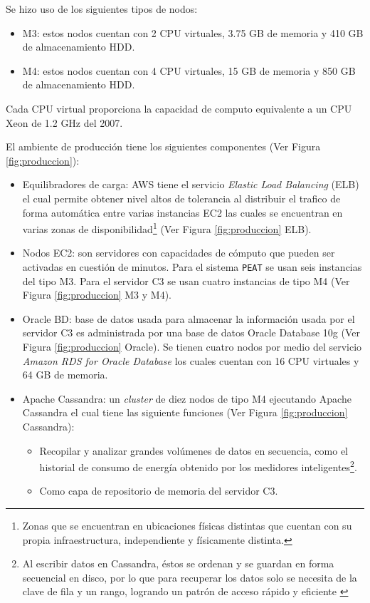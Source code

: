 
Se hizo uso de los siguientes tipos de nodos:
\begin{itemize}
\item M3: estos nodos cuentan con 2 CPU virtuales, 3.75 GB de memoria y
  410 GB de almacenamiento HDD.
\item M4: estos nodos cuentan con 4 CPU virtuales, 15 GB de memoria y
  850 GB de almacenamiento HDD.
\end{itemize}

Cada CPU virtual proporciona la capacidad de computo equivalente a un CPU
Xeon de 1.2 GHz del 2007.

\vspace{2.5mm}

El ambiente de producción tiene los siguientes componentes (Ver Figura \ref{fig:produccion}):
\begin{itemize}
\item Equilibradores de carga: AWS tiene el servicio \textit{Elastic Load Balancing}
  (ELB) el cual permite obtener nivel altos de tolerancia al distribuir el trafico
  de forma automática entre varias instancias EC2 las cuales se encuentran en
  varias zonas de disponibilidad\footnote{Zonas que se encuentran en
    ubicaciones físicas distintas que cuentan con su propia infraestructura,
    independiente y físicamente distinta.} (Ver Figura \ref{fig:produccion} ELB).
\item Nodos EC2: son servidores con capacidades de cómputo que pueden ser
  activadas en cuestión de minutos. Para el sistema \texttt{PEAT} se usan seis
  instancias del tipo M3. Para el servidor C3 se usan cuatro instancias de
  tipo M4 (Ver Figura \ref{fig:produccion} M3 y M4).
\item Oracle BD: base de datos usada para almacenar la información usada
  por el servidor C3 es administrada por una base de datos Oracle Database 10g
  (Ver Figura \ref{fig:produccion} Oracle). Se tienen cuatro nodos por medio del
  servicio \textit{Amazon RDS for Oracle Database} los cuales cuentan con
  16 CPU virtuales y 64 GB de memoria.
\item Apache Cassandra: un \textit{cluster} de diez nodos de tipo M4 ejecutando
  Apache Cassandra el cual tiene las siguiente funciones (Ver Figura
  \ref{fig:produccion} Cassandra):
  \begin{itemize}
  \item Recopilar y analizar grandes volúmenes de datos en secuencia, como el
    historial de consumo de energía obtenido por los medidores inteligentes\footnote{
      Al escribir datos en Cassandra, éstos se ordenan y se guardan en forma secuencial
      en disco, por lo que para recuperar los datos solo se necesita
      de la clave de fila y un rango, logrando un patrón de acceso rápido y eficiente
      \cite{33_time_series}}.
  \item Como capa de repositorio de memoria del servidor C3.
  \end{itemize}
\end{itemize}

